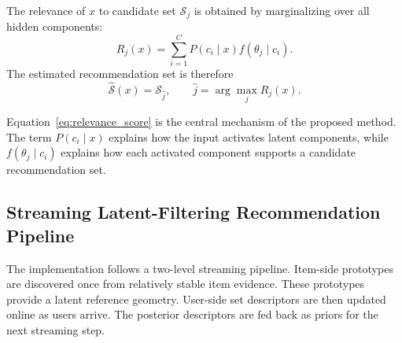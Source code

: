 \documentclass{article}
\theoremstyle{plain}
\theoremstyle{definition}
\theoremstyle{remark}
\begin{document}
The relevance of \(x\) to candidate set \(\mathcal S_j\) is obtained by marginalizing over all hidden components:
\begin{equation}
	\label{eq:relevance_score}
	R_j(x)
	=
	\sum_{i=1}^{C}
	P(c_i\mid x)
	f(\theta_j\mid c_i).
\end{equation}
The estimated recommendation set is therefore
\begin{equation}
	\label{eq:estimated_set}
	\widehat{\mathcal S}(x)
	=
	\mathcal S_{\widehat j},
	\qquad
	\widehat j
	=
	\arg\max_j R_j(x).
\end{equation}

Equation~\eqref{eq:relevance_score} is the central mechanism of the proposed method. The term \(P(c_i\mid x)\) explains how the input activates latent components, while \(f(\theta_j\mid c_i)\) explains how each activated component supports a candidate recommendation set.

\subsection{Streaming Latent-Filtering Recommendation Pipeline}
\label{subsec:streaming_pipeline}

The implementation follows a two-level streaming pipeline. Item-side prototypes are discovered once from relatively stable item evidence. These prototypes provide a latent reference geometry. User-side set descriptors are then updated online as users arrive. The posterior descriptors are fed back as priors for the next streaming step.
\end{document}
